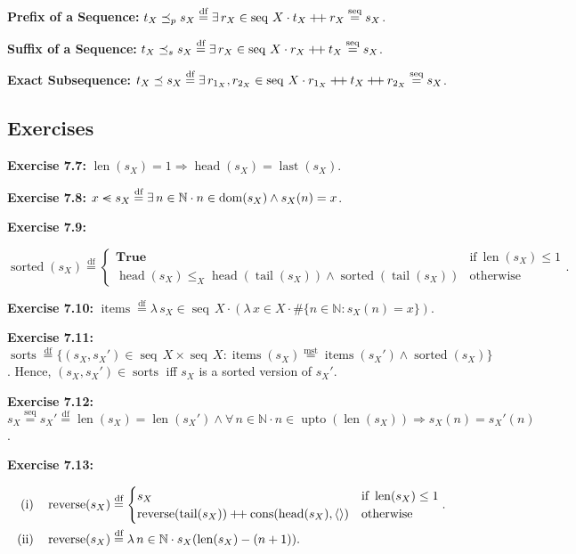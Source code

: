 \documentclass[12pt]{article}
\newcommand{\dfeq}{\stackrel{\text{df}}{=}}
\newcommand{\msteq}{\stackrel{\text{mst}}{=}}
\newcommand{\seqeq}{\stackrel{\text{seq}}{=}}
\newcommand{\seqin}{%
  \mathrel{\vphantom{<}\text{%
    \mathsurround=0pt
    \ooalign{$<$\cr$-$\cr}%
  }}%
}
\newcommand{\pp}{\mathbin{\mbox{{+}\nolinebreak\hspace{-.15em}{+}}}}
\DeclareMathOperator{\jtrue}{\mathbf{True}}
\DeclareMathOperator{\jseq}{seq}
\DeclareMathOperator{\jreverse}{reverse}
\DeclareMathOperator{\jdom}{dom}
\DeclareMathOperator{\jitems}{items}
\DeclareMathOperator{\jsorted}{sorted}
\DeclareMathOperator{\jupto}{upto}
\DeclareMathOperator{\jcons}{cons}
\DeclareMathOperator{\jhead}{head}
\DeclareMathOperator{\jlast}{last}
\DeclareMathOperator{\jtail}{tail}
\DeclareMathOperator{\jlen}{len}
\theoremstyle{plain}
\begin{document}
\textbf{Prefix of a Sequence:} $t_X \preceq_{p} s_X \dfeq \exists\,
r_X \in \jseq\, X \cdot t_X \pp r_X \seqeq s_X$.

\textbf{Suffix of a Sequence:} $t_X \preceq_{s} s_X \dfeq \exists\,
r_X \in \jseq\, X \cdot r_X \pp t_X \seqeq s_X$.

\textbf{Exact Subsequence:} $t_X \preceq s_X \dfeq \exists\,
r_{1_X}, r_{2_X} \in \jseq\, X \cdot r_{1_X} \pp t_X \pp r_{2_X}
\seqeq s_X$.

\subsection{Exercises}

\textbf{Exercise 7.7:} $\jlen(s_X) = 1 \Rightarrow \jhead(s_X) =
\jlast(s_X)$.

\textbf{Exercise 7.8:} $x \seqin s_X \dfeq \exists\, n \in
\mathbb{N} \cdot n \in \jdom(s_X) \land s_X(n) = x$.

\textbf{Exercise 7.9:}

$$
\jsorted(s_X) \dfeq
\begin{cases}
    \jtrue & \text{if}\ \jlen(s_X) \leq  1\\
    \jhead(s_X) \leq_{X} \jhead(\jtail(s_X)) \land
    \jsorted(\jtail(s_X)) & \text{otherwise}
\end{cases}.
$$

\textbf{Exercise 7.10:} $\jitems \dfeq \lambda\, s_X \in \jseq\,
X \cdot (\lambda\, x \in X \cdot \#\{n \in \mathbb{N} : s_X(n) =
x\})$.

\textbf{Exercise 7.11:} $\operatorname{sorts} \dfeq \{(s_X,
s_X') \in \jseq\, X \times \jseq\, X : \jitems(s_X) \msteq
\jitems(s_X') \land \jsorted(s_X) \}$. Hence, $(s_X, s_X') \in
\operatorname{sorts}$ iff $s_X$ is a sorted version of $s_X'$.

\textbf{Exercise 7.12:} $s_X \seqeq s_X' \dfeq \jlen(s_X) =
\jlen(s_X') \land \forall\, n \in \mathbb{N} \cdot n \in
\jupto(\jlen(s_X)) \Rightarrow s_X(n) = s_X'(n)$. 

\textbf{Exercise 7.13:}

$$
\begin{aligned}
\text{(i)}\quad &
\jreverse(s_X) \dfeq
\begin{cases}
    s_X & \text{if}\ \jlen(s_X) \leq 1\\
    \jreverse(\jtail(s_X)) \pp \jcons(\jhead(s_X), \langle
    \rangle) & \text{otherwise}
\end{cases}.\\
\text{(ii)}\quad &
\jreverse(s_X) \dfeq \lambda\, n \in \mathbb{N} \cdot
s_X(\jlen(s_X) - (n + 1)).
\end{aligned}
$$
\end{document}
